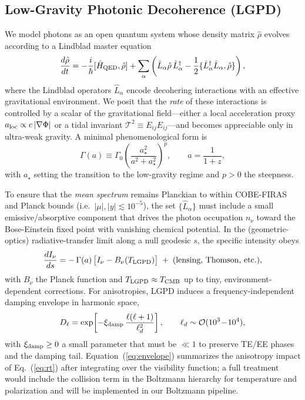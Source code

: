 \label{sec:theory}

\subsection{Low-Gravity Photonic Decoherence (LGPD)}
We model photons as an open quantum system whose density matrix $\hat{\rho}$ evolves according to a Lindblad master equation
\begin{equation}
\frac{d\hat{\rho}}{dt} = -\frac{i}{\hbar}[\hat{H}_{\rm QED},\hat{\rho}] 
 + \sum_\alpha \left( \hat{L}_\alpha \hat{\rho}\,\hat{L}_\alpha^\dagger 
 - \frac{1}{2}\{\hat{L}_\alpha^\dagger \hat{L}_\alpha, \hat{\rho} \} \right),
\label{eq:lindblad}
\end{equation}
where the Lindblad operators $\hat{L}_\alpha$ encode decohering interactions with an effective gravitational environment. We posit that the \emph{rate} of these interactions is controlled by a scalar of the gravitational field---either a local acceleration proxy $a_{\rm loc}\propto c\,|\nabla\Phi|$ or a tidal invariant $\mathcal{T}^2 \equiv E_{ij}E_{ij}$---and becomes appreciable only in ultra-weak gravity. A minimal phenomenological form is
\begin{equation}
\Gamma(a) \equiv \Gamma_0 \left(\frac{a_\star^2}{a^2+a_\star^2}\right)^p,\qquad a=\frac{1}{1+z},
\label{eq:Gamma}
\end{equation}
with $a_\star$ setting the transition to the low-gravity regime and $p>0$ the steepness.

To ensure that the \emph{mean spectrum} remains Planckian to within COBE-FIRAS and Planck bounds (i.e.\ $|\mu|,|y|\lesssim 10^{-5}$), the set $\{\hat{L}_\alpha\}$ must include a small emissive/absorptive component that drives the photon occupation $n_\nu$ toward the Bose-Einstein fixed point with vanishing chemical potential. In the (geometric-optics) radiative-transfer limit along a null geodesic $s$, the specific intensity obeys
\begin{equation}
\frac{d I_\nu}{ds} = -\,\Gamma(a)\,\big[I_\nu - B_\nu(T_{\rm LGPD})\big] \;+\; \text{(lensing, Thomson, etc.)},
\label{eq:rt}
\end{equation}
with $B_\nu$ the Planck function and $T_{\rm LGPD}\approx T_{\rm CMB}$ up to tiny, environment-dependent corrections. For anisotropies, LGPD induces a frequency-independent damping envelope in harmonic space,
\begin{equation}
D_\ell = \exp\!\left[- \xi_{\rm damp}\, \frac{\ell(\ell+1)}{\ell_d^2} \right],\qquad \ell_d\sim {\cal O}(10^3\!-\!10^4),
\label{eq:envelope}
\end{equation}
with $\xi_{\rm damp}\ge 0$ a small parameter that must be $\ll 1$ to preserve TE/EE phases and the damping tail. Equation~(\ref{eq:envelope}) summarizes the anisotropy impact of Eq.~(\ref{eq:rt}) after integrating over the visibility function; a full treatment would include the collision term in the Boltzmann hierarchy for temperature and polarization and will be implemented in our Boltzmann pipeline.

